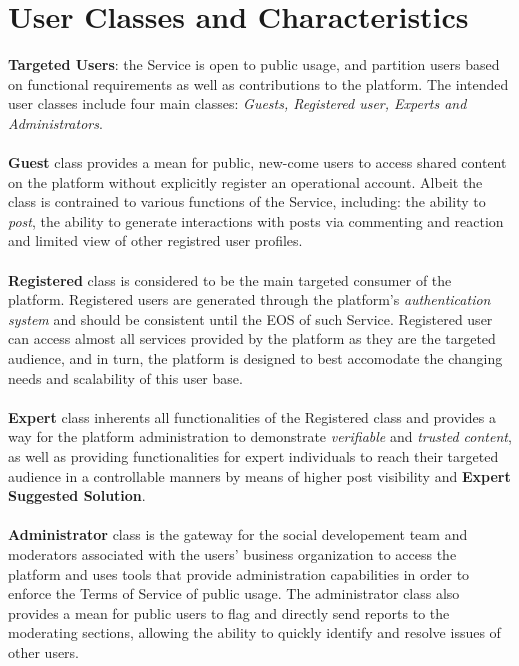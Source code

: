     \section{User Classes and Characteristics}
    \textbf{Targeted Users}: the Service is open to public usage, and partition users based on functional requirements as well as contributions to the platform.
    The intended user classes include four main classes: \textit{Guests, Registered user, Experts and Administrators}.
    \\\\
    \textbf{Guest} class provides a mean for public, new-come users to access shared content on the platform without explicitly register an operational account. Albeit the class
    is contrained to various functions of the Service, including: the ability to \textit{post}, the ability to generate interactions with posts via commenting and reaction and limited view of other registred user profiles.
    \\\\
    \textbf{Registered} class is considered to be the main targeted consumer of the platform. Registered users are generated through the platform's \textit{authentication system} and should be consistent
    until the \ac{EOS} of such Service. Registered user can access almost all services provided by the platform as they are the targeted audience, and in turn, the platform is designed
    to best accomodate the changing needs and scalability of this user base.
    \\\\
    \textbf{Expert} class inherents all functionalities of the Registered class and provides a way for the platform administration to demonstrate \textit{verifiable} and \textit{trusted content}, as well as providing functionalities
    for expert individuals to reach their targeted audience in a controllable manners by means of higher post visibility and \textbf{Expert Suggested Solution}.
    \\\\
    \textbf{Administrator} class is the gateway for the social developement team and moderators associated with the users' business organization to access the platform and uses tools that provide administration capabilities
    in order to enforce the Terms of Service of public usage. The administrator class also provides a mean for public users to flag and directly send reports to the moderating sections, allowing the ability to 
    quickly identify and resolve issues of other users.

